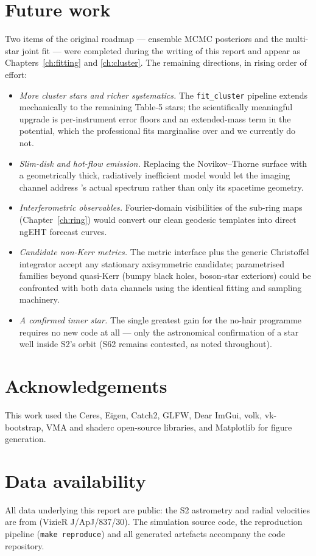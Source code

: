 \section{Future work}
\label{sec:futurework}

Two items of the original roadmap — ensemble MCMC posteriors and the
multi-star joint fit — were completed during the writing of this report
and appear as Chapters~\ref{ch:fitting} and \ref{ch:cluster}. The
remaining directions, in rising order of effort:

\begin{itemize}
\item \emph{More cluster stars and richer systematics.} The
\texttt{fit\_cluster} pipeline extends mechanically to the remaining
Table-5 stars; the scientifically meaningful upgrade is per-instrument
error floors and an extended-mass term in the potential, which the
professional fits marginalise over and we currently do not.
\item \emph{Slim-disk and hot-flow emission.} Replacing the
Novikov--Thorne surface with a geometrically thick, radiatively
inefficient model would let the imaging channel address \sgra's actual
spectrum rather than only its spacetime geometry.
\item \emph{Interferometric observables.} Fourier-domain visibilities
of the sub-ring maps (Chapter~\ref{ch:ring}) would convert our clean
geodesic templates into direct ngEHT forecast curves.
\item \emph{Candidate non-Kerr metrics.} The metric interface plus the
generic Christoffel integrator accept any stationary axisymmetric
candidate; parametrised families beyond quasi-Kerr (bumpy black holes,
boson-star exteriors) could be confronted with both data channels using
the identical fitting and sampling machinery.
\item \emph{A confirmed inner star.} The single greatest gain for the
no-hair programme requires no new code at all — only the astronomical
confirmation of a star well inside S2's orbit (S62 remains contested,
as noted throughout).
\end{itemize}

\section*{Acknowledgements}
This work used the Ceres, Eigen, Catch2, GLFW, Dear ImGui, volk,
vk-bootstrap, VMA and shaderc open-source libraries, and Matplotlib for
figure generation.

\section*{Data availability}
All data underlying this report are public: the S2 astrometry and radial
velocities are from \citet{Gillessen2017} (VizieR J/ApJ/837/30). The
simulation source code, the reproduction pipeline
(\texttt{make reproduce}) and all generated artefacts accompany the code
repository.
